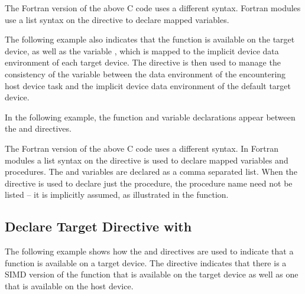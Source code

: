 
The Fortran version of the above C code uses a different syntax. Fortran modules 
use a list syntax on the  directive to declare 
mapped variables.


\pagebreak
The following example also indicates that the function  is available on the 
target device, as well as the variable , which is mapped to the implicit device 
data environment of each target device. The  directive 
is then used to manage the consistency of the variable  between the data environment 
of the encountering host device task and the implicit device data environment of 
the default target device.

In the following example, the function and variable declarations appear between 
the  and  
directives.


The Fortran version of the above C code uses a different syntax. In Fortran modules 
a list syntax on the  directive is used to declare 
mapped variables and procedures. The  and  variables are declared as a comma 
separated list. When the  directive is used to 
declare just the procedure, the procedure name need not be listed -- it is implicitly 
assumed, as illustrated in the  function.


\subsection{Declare Target Directive with }
\label{subsec:declare_target_simd}




The following example shows how the  and 
 directives are used to indicate that a function 
is available on a target device. The  directive indicates 
that there is a SIMD version of the function  that is available on the target 
device as well as one that is available on the host device.

